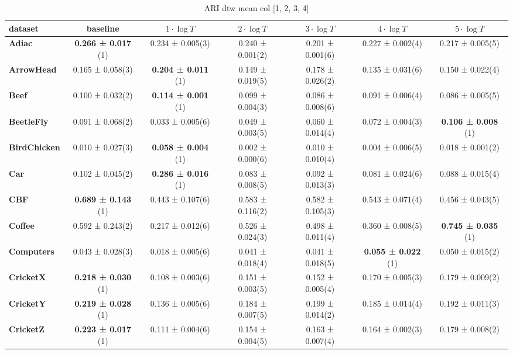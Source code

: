     \begin{table}[ht]
    \caption{ARI dtw mean col [1, 2, 3, 4]} 
    \begin{adjustbox}{width=\textwidth}
    \begin{tabular}{lcccccc}
    \hline
    dataset & baseline & \textbf{$1\cdot \log{T}$} & \textbf{$2\cdot \log{T}$} & \textbf{$3\cdot \log{T}$} & \textbf{$4\cdot \log{T}$} & \textbf{$5\cdot \log{T}$} \\ \hline
    \textbf{Adiac} & \textbf{0.266 ± 0.017} (1) & 0.234 ± 0.005(3) & 0.240 ± 0.001(2) & 0.201 ± 0.001(6) & 0.227 ± 0.002(4) & 0.217 ± 0.005(5) \\
    \textbf{ArrowHead} & 0.165 ± 0.058(3) & \textbf{0.204 ± 0.011} (1) & 0.149 ± 0.019(5) & 0.178 ± 0.026(2) & 0.135 ± 0.031(6) & 0.150 ± 0.022(4) \\
    \textbf{Beef} & 0.100 ± 0.032(2) & \textbf{0.114 ± 0.001} (1) & 0.099 ± 0.004(3) & 0.086 ± 0.008(6) & 0.091 ± 0.006(4) & 0.086 ± 0.005(5) \\
    \textbf{BeetleFly} & 0.091 ± 0.068(2) & 0.033 ± 0.005(6) & 0.049 ± 0.003(5) & 0.060 ± 0.014(4) & 0.072 ± 0.004(3) & \textbf{0.106 ± 0.008} (1) \\
    \textbf{BirdChicken} & 0.010 ± 0.027(3) & \textbf{0.058 ± 0.004} (1) & 0.002 ± 0.000(6) & 0.010 ± 0.010(4) & 0.004 ± 0.006(5) & 0.018 ± 0.001(2) \\
    \textbf{Car} & 0.102 ± 0.045(2) & \textbf{0.286 ± 0.016} (1) & 0.083 ± 0.008(5) & 0.092 ± 0.013(3) & 0.081 ± 0.024(6) & 0.088 ± 0.015(4) \\
    \textbf{CBF} & \textbf{0.689 ± 0.143} (1) & 0.443 ± 0.107(6) & 0.583 ± 0.116(2) & 0.582 ± 0.105(3) & 0.543 ± 0.071(4) & 0.456 ± 0.043(5) \\
    \textbf{Coffee} & 0.592 ± 0.243(2) & 0.217 ± 0.012(6) & 0.526 ± 0.024(3) & 0.498 ± 0.011(4) & 0.360 ± 0.008(5) & \textbf{0.745 ± 0.035} (1) \\
    \textbf{Computers} & 0.043 ± 0.028(3) & 0.018 ± 0.005(6) & 0.041 ± 0.018(4) & 0.041 ± 0.018(5) & \textbf{0.055 ± 0.022} (1) & 0.050 ± 0.015(2) \\
    \textbf{CricketX} & \textbf{0.218 ± 0.030} (1) & 0.108 ± 0.003(6) & 0.151 ± 0.003(5) & 0.152 ± 0.005(4) & 0.170 ± 0.005(3) & 0.179 ± 0.009(2) \\
    \textbf{CricketY} & \textbf{0.219 ± 0.028} (1) & 0.136 ± 0.005(6) & 0.184 ± 0.007(5) & 0.199 ± 0.014(2) & 0.185 ± 0.014(4) & 0.192 ± 0.011(3) \\
    \textbf{CricketZ} & \textbf{0.223 ± 0.017} (1) & 0.111 ± 0.004(6) & 0.154 ± 0.004(5) & 0.163 ± 0.007(4) & 0.164 ± 0.002(3) & 0.179 ± 0.008(2) \\

\end{tabular}
\end{adjustbox}
\end{table}
